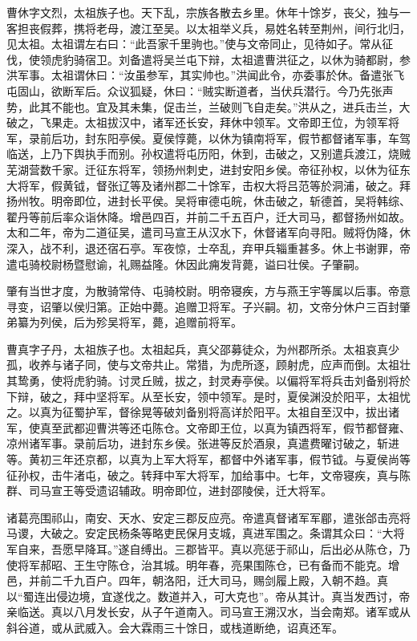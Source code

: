 \documentclass[12pt,UTF8]{ctexbook}
\begin{document}
曹休字文烈，太祖族子也。天下乱，宗族各散去乡里。休年十馀岁，丧父，独与一客担丧假葬，携将老母，渡江至吴。以太祖举义兵，易姓名转至荆州，间行北归，见太祖。太祖谓左右曰：“此吾家千里驹也。”使与文帝同止，见待如子。常从征伐，使领虎豹骑宿卫。刘备遣将吴兰屯下辩，太祖遣曹洪征之，以休为骑都尉，参洪军事。太祖谓休曰：“汝虽参军，其实帅也。”洪闻此令，亦委事於休。备遣张飞屯固山，欲断军后。众议狐疑，休曰：“贼实断道者，当伏兵潜行。今乃先张声势，此其不能也。宜及其未集，促击兰，兰破则飞自走矣。”洪从之，进兵击兰，大破之，飞果走。太祖拔汉中，诸军还长安，拜休中领军。文帝即王位，为领军将军，录前后功，封东阳亭侯。夏侯惇薨，以休为镇南将军，假节都督诸军事，车驾临送，上乃下舆执手而别。孙权遣将屯历阳，休到，击破之，又别遣兵渡江，烧贼芜湖营数千家。迁征东将军，领扬州刺史，进封安阳乡侯。帝征孙权，以休为征东大将军，假黄钺，督张辽等及诸州郡二十馀军，击权大将吕范等於洞浦，破之。拜扬州牧。明帝即位，进封长平侯。吴将审德屯皖，休击破之，斩德首，吴将韩综、翟丹等前后率众诣休降。增邑四百，并前二千五百户，迁大司马，都督扬州如故。太和二年，帝为二道征吴，遣司马宣王从汉水下，休督诸军向寻阳。贼将伪降，休深入，战不利，退还宿石亭。军夜惊，士卒乱，弃甲兵辎重甚多。休上书谢罪，帝遣屯骑校尉杨暨慰谕，礼赐益隆。休因此痈发背薨，谥曰壮侯。子肇嗣。

肇有当世才度，为散骑常侍、屯骑校尉。明帝寝疾，方与燕王宇等属以后事。帝意寻变，诏肇以侯归第。正始中薨。追赠卫将军。子兴嗣。初，文帝分休户三百封肇弟纂为列侯，后为殄吴将军，薨，追赠前将军。

曹真字子丹，太祖族子也。太祖起兵，真父邵募徒众，为州郡所杀。太祖哀真少孤，收养与诸子同，使与文帝共止。常猎，为虎所逐，顾射虎，应声而倒。太祖壮其鸷勇，使将虎豹骑。讨灵丘贼，拔之，封灵寿亭侯。以偏将军将兵击刘备别将於下辩，破之，拜中坚将军。从至长安，领中领军。是时，夏侯渊没於阳平，太祖忧之。以真为征蜀护军，督徐晃等破刘备别将高详於阳平。太祖自至汉中，拔出诸军，使真至武都迎曹洪等还屯陈仓。文帝即王位，以真为镇西将军，假节都督雍、凉州诸军事。录前后功，进封东乡侯。张进等反於酒泉，真遣费曜讨破之，斩进等。黄初三年还京都，以真为上军大将军，都督中外诸军事，假节钺。与夏侯尚等征孙权，击牛渚屯，破之。转拜中军大将军，加给事中。七年，文帝寝疾，真与陈群、司马宣王等受遗诏辅政。明帝即位，进封邵陵侯，迁大将军。

诸葛亮围祁山，南安、天水、安定三郡反应亮。帝遣真督诸军军郿，遣张郃击亮将马谡，大破之。安定民杨条等略吏民保月支城，真进军围之。条谓其众曰：“大将军自来，吾愿早降耳。”遂自缚出。三郡皆平。真以亮惩于祁山，后出必从陈仓，乃使将军郝昭、王生守陈仓，治其城。明年春，亮果围陈仓，已有备而不能克。增邑，并前二千九百户。四年，朝洛阳，迁大司马，赐剑履上殿，入朝不趋。真以“蜀连出侵边境，宜遂伐之。数道并入，可大克也”。帝从其计。真当发西讨，帝亲临送。真以八月发长安，从子午道南入。司马宣王溯汉水，当会南郑。诸军或从斜谷道，或从武威入。会大霖雨三十馀日，或栈道断绝，诏真还军。
\end{document}
